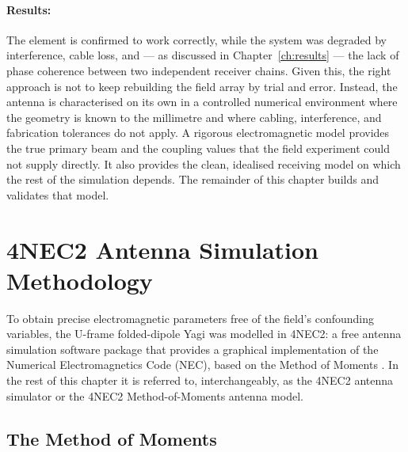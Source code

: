 \paragraph{Results:} The element is confirmed to work correctly, while the
system was degraded by interference, cable loss, and — as discussed in
Chapter~\ref{ch:results} — the lack of phase coherence between two independent
receiver chains. Given this, the right approach is not to keep rebuilding the
field array by trial and error. Instead, the antenna is characterised on its own
in a controlled numerical environment where the geometry is known to the
millimetre and where cabling, interference, and fabrication tolerances do not
apply. A rigorous electromagnetic model provides the true primary beam and the
coupling values that the field experiment could not supply directly. It also
provides the clean, idealised receiving model on which the rest of the
simulation depends. The remainder of this chapter builds and validates that
model.

\section{4NEC2 Antenna Simulation Methodology}
\label{sec:simulation}

To obtain precise electromagnetic parameters free of the field's confounding
variables, the U-frame folded-dipole Yagi was modelled in 4NEC2: a free antenna
simulation software package that provides a graphical implementation of the
Numerical Electromagnetics Code (NEC), based on the Method of Moments
\citep{nec2}. In the rest of this chapter it is referred to, interchangeably,
as the 4NEC2 antenna simulator or the 4NEC2 Method-of-Moments antenna model.

\subsection{The Method of Moments}
\label{subsec:mom}


